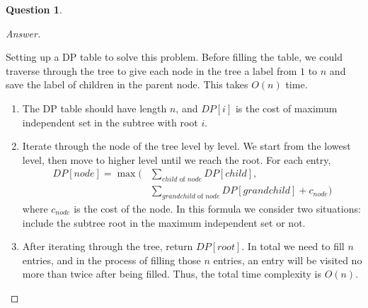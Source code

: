 \documentclass{article}
\theoremstyle{plain}
\newtheorem{question}{Question}
\newenvironment{answer}[1][Answer]
    {\begin{proof}[#1]{$ $}\renewcommand\qedsymbol{$\vartriangle$}}
    {\end{proof}}
\begin{document}
\begin{question}
\end{question}
\begin{answer}
    \begin{enumerate}
        Setting up a DP table to solve this problem. Before filling the table, we could traverse through the tree to give each node in the tree a label from $1$ to $n$ and save the label of children in the parent node. This takes $O(n)$ time.
        \begin{enumerate}
            \item
            The DP table should have length $n$, and $DP[i]$ is the cost of maximum independent set in the subtree with root $i$.
            \item
            Iterate through the node of the tree level by level. We start from the lowest level, then move to higher level until we reach the root. For each entry,
            \begin{equation*}
                \begin{split}
                    DP[node] = \max(&\sum_{child \text{ of } node} DP[child],\\
                    &\sum_{grandchild \text{ of } node} DP[grandchild] + c_{node})
                \end{split}
            \end{equation*}
            where $c_{node}$ is the cost of the node. In this formula we consider two situations: include the subtree root in the maximum independent set or not.
            \item
            After iterating through the tree, return $DP[root]$. In total we need to fill $n$ entries, and in the process of filling those $n$ entries, an entry will be visited no more than twice after being filled. Thus, the total time complexity is $O(n)$.
        \end{enumerate}
    \end{enumerate}

\end{answer}
\end{document}
